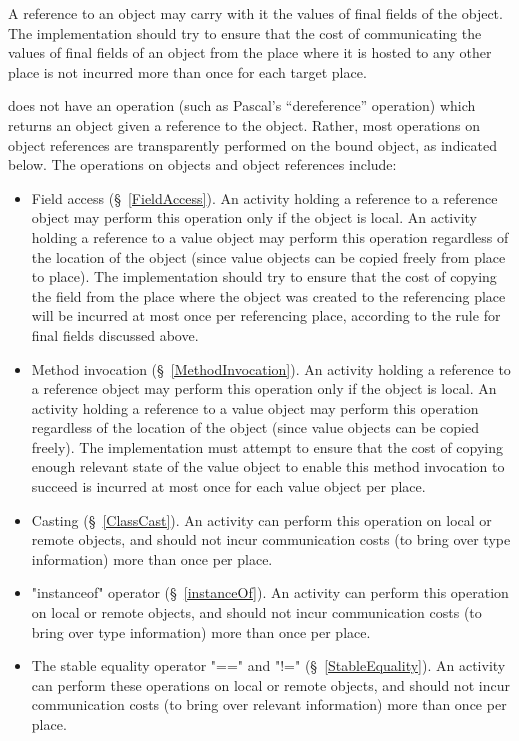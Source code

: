 A reference to an object may carry with it the values of final fields
of the object. The implementation should try to ensure that the cost
of communicating the values of final fields of an object from the
place where it is hosted to any other place is not incurred more than
once for each target place.

{}\Xten{} does not have an operation (such as Pascal's ``dereference''
operation) which returns an object given a reference to the
object. Rather, most operations on object references are transparently
performed on the bound object, as indicated below. The operations on
objects and object references include:
\begin{itemize}

{}\item Field access (\S~\ref{FieldAccess}). An activity holding a
reference to a reference object may perform this operation only if the
object is local.  An activity holding a reference to a value object
may perform this operation regardless of the location of the object
(since value objects can be copied freely from place to place).  The
implementation should try to ensure that the cost of copying the field
from the place where the object was created to the referencing place
will be incurred at most once per referencing place, according to the
rule for final fields discussed above.

\item Method invocation (\S~\ref{MethodInvocation}).  An activity
holding a reference to a reference object may perform this operation
only if the object is local.  An activity holding a reference to a
value object may perform this operation regardless of the location of
the object (since value objects can be copied freely). The \Xten{}
implementation must attempt to ensure that the cost of copying enough
relevant state of the value object to enable this method invocation to
succeed is incurred at most once for each value object per place.

{}\item Casting (\S~\ref{ClassCast}).  An activity can perform this
operation on local or remote objects, and should not incur
communication costs (to bring over type information) more than once
per place.

{}\item \xcd"instanceof" operator (\S~\ref{instanceOf}).  An activity
can perform this operation on local or remote objects, and should not
incur communication costs (to bring over type information) more than
once per place.

\item The stable equality operator \xcd"==" and \xcd"!="
(\S~\ref{StableEquality}). An activity can perform these operations on
local or remote objects, and should not incur communication costs
(to bring over relevant information) more than once per place.

\end{itemize}

